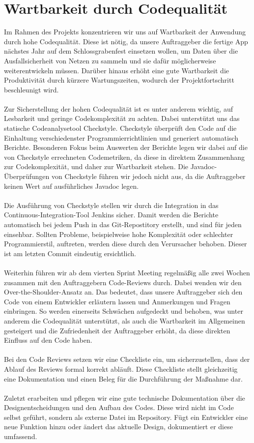 \documentclass[accentcolor=tud0b,12pt,paper=a4]{tudreport}
\begin{document}
    \section{Wartbarkeit durch Codequalität}
      Im Rahmen des Projekts konzentrieren wir uns auf Wartbarkeit der Anwendung durch hohe Codequalität. Diese ist nötig, da unsere Auftraggeber die fertige App nächstes Jahr auf dem Schlossgrabenfest einsetzen wollen, um Daten über die Ausfallsicherheit von Netzen zu sammeln und sie dafür möglicherweise weiterentwickeln müssen. Darüber hinaus erhöht eine gute Wartbarkeit die Produktivität durch kürzere Wartungszeiten, wodurch der Projektfortschritt beschleunigt wird.\\\\
      Zur Sicherstellung der hohen Codequalität ist es unter anderem wichtig, auf Lesbarkeit und geringe Codekomplexität zu achten. Dabei unterstützt uns das statische Codeanalysetool Checkstyle. Checkstyle überprüft den Code auf die Einhaltung verschiedenster Programmierrichtlinien und generiert automatisch Berichte. Besonderen Fokus beim Auswerten der Berichte legen wir dabei auf die von Checkstyle errechneten Codemetriken, da diese in direktem Zusammenhang zur Codekomplexität, und daher zur Wartbarkeit stehen. Die Javadoc-Überprüfungen von Checkstyle führen wir jedoch nicht aus, da die Auftraggeber keinen Wert auf ausführliches Javadoc legen.\\\\
      Die Ausführung von Checkstyle stellen wir durch die Integration in das Continuous-Integration-Tool Jenkins sicher. Damit werden die Berichte automatisch bei jedem Push in das Git-Repostitory erstellt, und sind für jeden einsehbar. Sollten Probleme, beispielweise hohe Komplexität oder schlechter Programmierstil, auftreten, werden diese durch den Verursacher behoben. Dieser ist am letzten Commit eindeutig ersichtlich.\\\\
      Weiterhin führen wir ab dem vierten Sprint Meeting regelmäßig alle zwei Wochen zusammen mit den Auftraggebern Code-Reviews durch. Dabei wenden wir den Over-the-Shoulder-Ansatz an. Das bedeutet, dass unsere Auftraggeber sich den Code von einem Entwickler erläutern lassen und Anmerkungen und Fragen einbringen. So werden einerseits Schwächen aufgedeckt und behoben, was unter anderem die Codequalität unterstützt, als auch die Wartbarkeit im Allgemeinen gesteigert und die Zufriedenheit der Auftraggeber erhöht, da diese direkten Einfluss auf den Code haben.\\\\
      Bei den Code Reviews setzen wir eine Checkliste ein, um sicherzustellen, dass der Ablauf des Reviews formal korrekt abläuft. Diese Checkliste stellt gleichzeitig eine Dokumentation und einen Beleg für die Durchführung der Maßnahme dar.\\\\
      Zuletzt erarbeiten und pflegen wir eine gute technische Dokumentation über die Designentscheidungen und den Aufbau des Codes. Diese wird nicht im Code selbst geführt, sondern als externe Datei im Repository. Fügt ein Entwickler eine neue Funktion hinzu oder ändert das aktuelle Design, dokumentiert er diese umfassend.
\end{document}
